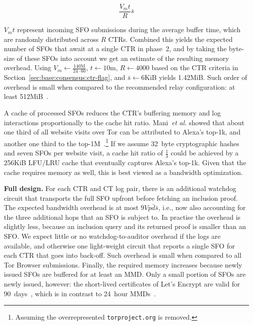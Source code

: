 \begin{equation} \label{eq:memory}
	\frac{V_mt}{R} \bar{s}
\end{equation}

$V_mt$ represent incoming SFO submissions during the average buffer time, which
are randomly distributed across $R$ CTRs.  Combined this yields the expected
number of SFOs that await at a single CTR in phase~2, and by taking the
byte-size of these SFOs into account we get an estimate of the resulting memory
overhead.  Using
	$V_m \gets \frac{140\textrm{M}}{24\cdot60}$,
	$t \gets 10$m,
	$R \gets 4000$ based on the CTR criteria in
		Section~\ref{sec:base:consensus:ctr-flag}, and
	$\bar{s} \gets 6\textrm{KiB}$
yields 1.42MiB.  Such order of overhead is small when compared to the
recommended relay configuration:
	at least 512MiB~\cite{relay-config}.

A cache of processed SFOs reduces the CTR's buffering memory and log
interactions proportionally to the cache hit ratio.  Mani~\emph{et al.} showed
that about one third of all website visits over Tor can be attributed to Alexa's
top-1k, and another one third to the top-1M~\cite{mani}.\footnote{%
	Assuming the overrepresented
	\texttt{torproject.org} is removed.
} If we assume 32~byte cryptographic hashes and seven SFOs per website visit,
a cache hit ratio of $\frac{1}{3}$ could be achieved by a 256KiB LFU/LRU cache
that eventually captures Alexa's top-1k.  Given that the cache requires
memory as well, this is best viewed as a bandwidth optimization.

\textbf{Full design.}
For each CTR and CT log pair, there is an additional watchdog circuit that
transports the full SFO upfront before fetching an inclusion proof.  The
expected bandwidth overhead is at most $9Vp\bar{d}\bar{s}$, i.e., now
also accounting for the three additional hops that an SFO is subject to.  In
practise the overhead is slightly less, because an inclusion query and its
returned proof is smaller than an SFO.  We expect little or no
watchdog-to-auditor overhead if the logs are available, and otherwise one
light-weight circuit that reports a single SFO for each CTR that goes into
back-off.  Such overhead is small when compared to all Tor Browser submissions.
Finally, the required memory increases because newly issued SFOs are buffered
for at least an MMD.  Only a small portion of SFOs are newly issued, however:
	the short-lived certificates of Let's Encrypt are valid for
	90~days~\cite{le}, which is in contrast to 24~hour
	MMDs~\cite{google-log-policy}.

